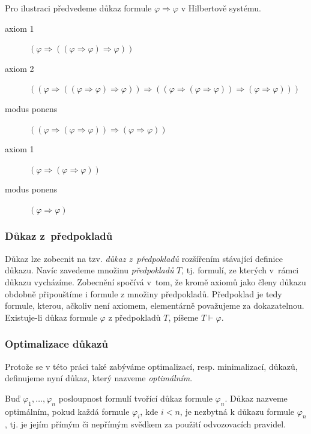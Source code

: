 \documentclass[thesis=B,czech,hidelinks]{thesis}[2012/06/26]
\begin{document}
\begin{exm}
\label{exm:proof_a>a}
	Pro ilustraci předvedeme důkaz formule $\varphi \Rightarrow \varphi$ v Hilbertově systému.
	\begin{description}
		\item[axiom 1] $(\varphi \Rightarrow ((\varphi \Rightarrow \varphi) \Rightarrow \varphi))$
		\item[axiom 2] $((\varphi \Rightarrow ((\varphi \Rightarrow \varphi) \Rightarrow \varphi)) \Rightarrow ((\varphi \Rightarrow (\varphi \Rightarrow \varphi)) \Rightarrow (\varphi \Rightarrow \varphi)))$
		\item[modus ponens] $((\varphi \Rightarrow (\varphi \Rightarrow \varphi)) \Rightarrow (\varphi \Rightarrow \varphi))$
		\item[axiom 1] $(\varphi \Rightarrow (\varphi \Rightarrow \varphi))$
		\item[modus ponens] $(\varphi \Rightarrow \varphi)$
	\end{description}
\end{exm}

\subsubsection{Důkaz z~předpokladů}
\label{sec:proof_theory}

Důkaz lze zobecnit na tzv. \emph{důkaz z~předpokladů} rozšířením stávající definice důkazu. Navíc zavedeme množinu \emph{předpokladů} $T$, tj. formulí, ze kterých v~rámci důkazu vycházíme. Zobecnění spočívá v~tom, že kromě axiomů jako členy důkazu obdobně připouštíme i formule z množiny předpokladů. Předpoklad je tedy formule, kterou, ačkoliv není axiomem, elementárně považujeme za dokazatelnou. Existuje-li důkaz formule $\varphi$ z předpokladů $T$, píšeme $T \vdash \varphi$.

\subsubsection{Optimalizace důkazů}

Protože se v této práci také zabýváme optimalizací, resp. minimalizací, důkazů, definujeme nyní důkaz, který nazveme \emph{optimálním}.

\begin{dfn}
\label{dfn:optimal_proof}
Buď $\varphi_1, \ldots, \varphi_n$ posloupnost formulí tvořící důkaz formule $\varphi_n$. Důkaz nazveme optimálním, pokud každá formule $\varphi_i$, kde $i < n$, je nezbytná k důkazu formule $\varphi_n$, tj. je jejím přímým či nepřímým svědkem za použití odvozovacích pravidel.
\end{dfn}
\end{document}
